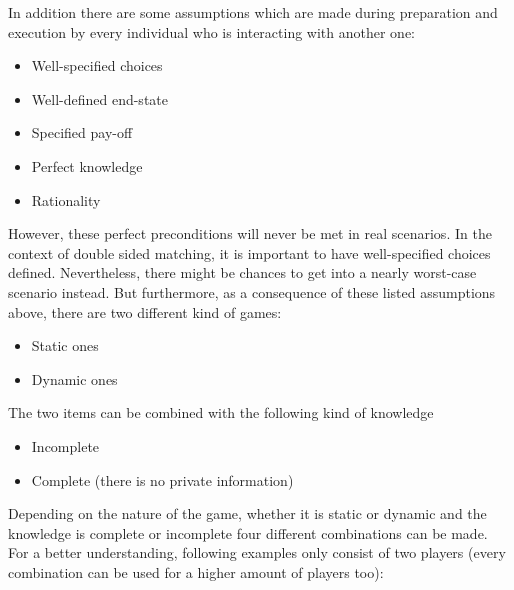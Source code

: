 In addition there are some assumptions which are made during preparation and execution by every individual who is interacting with another one:
\begin{itemize}
	\item Well-specified choices
	\item Well-defined end-state
	\item Specified pay-off
	\item Perfect knowledge
	\item Rationality 
\end{itemize}

However, these perfect preconditions will never be met in real scenarios. 
In the context of double sided matching, it is important to have well-specified choices defined. 
Nevertheless, there might be chances to get into a nearly worst-case scenario instead.
But furthermore, as a consequence of these listed assumptions above, there are two different kind of games:
 
\begin{itemize}
	\item Static ones
	\item Dynamic ones
\end{itemize}

The two items can be combined with the following kind of knowledge

\begin{itemize}
	\item Incomplete
	\item Complete (there is no private information)
\end{itemize}

Depending on the nature of the game, whether it is static or dynamic and the knowledge is complete or incomplete four different combinations can be made.
For a better understanding, following examples only consist of two players (every combination can be used for a higher amount of players too):

